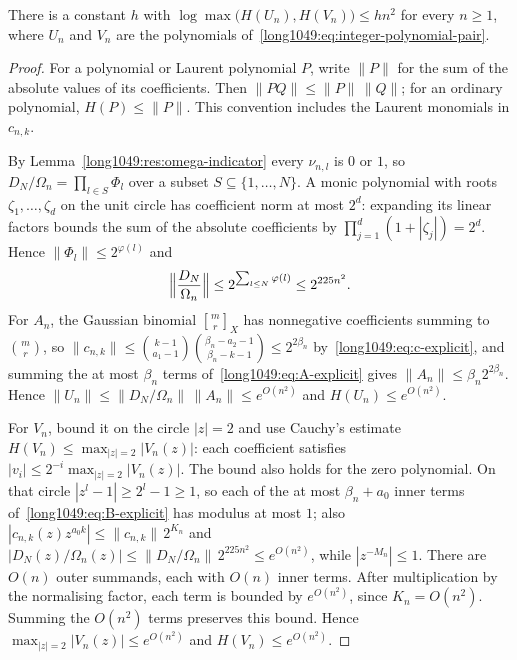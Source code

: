 \documentclass[11pt]{article}
\begin{document}
\begin{lemma}\label{long1049:res:sourceheight}
There is a constant $h$ with
$\log\max\bigl(H(U_n),H(V_n)\bigr)\le hn^{2}$ for every $n\ge1$, where $U_n$ and
$V_n$ are the polynomials of~\eqref{long1049:eq:integer-polynomial-pair}.
\end{lemma}

\begin{proof}
For a polynomial or Laurent polynomial $P$, write $\|P\|$ for the sum
of the absolute values of its coefficients. Then
$\|PQ\|\le\|P\|\,\|Q\|$; for an ordinary polynomial,
$H(P)\le\|P\|$. This convention includes the Laurent monomials in
$c_{n,k}$.

By Lemma~\ref{long1049:res:omega-indicator} every $\nu_{n,l}$ is $0$ or $1$, so
$D_N/\Omega_n=\prod_{l\in S}\Phi_l$ over a subset $S\subseteq\{1,\dots,N\}$.
A monic polynomial with roots $\zeta_1,\ldots,\zeta_d$ on the unit circle
has coefficient norm at most $2^d$: expanding its linear factors bounds
the sum of the absolute coefficients by
$\prod_{j=1}^d(1+|\zeta_j|)=2^d$. Hence $\|\Phi_l\|\le2^{\varphi(l)}$ and
\[
 \Bigl\|\frac{D_N}{\Omega_n}\Bigr\|\le2^{\sum_{l\le N}\varphi(l)}\le2^{225n^{2}} .
\]
For $A_n$, the Gaussian binomial $\genfrac{[}{]}{0pt}{}{m}{r}_X$ has nonnegative
coefficients summing to $\binom{m}{r}$, so
$\|c_{n,k}\|\le\binom{k-1}{a_1-1}\binom{\beta_n-a_2-1}{\beta_n-k-1}\le2^{2\beta_n}$
by~\eqref{long1049:eq:c-explicit}, and summing the at most $\beta_n$ terms
of~\eqref{long1049:eq:A-explicit} gives $\|A_n\|\le\beta_n2^{2\beta_n}$.  Hence
$\|U_n\|\le\|D_N/\Omega_n\|\,\|A_n\|\le e^{O(n^{2})}$ and
$H(U_n)\le e^{O(n^{2})}$.

For $V_n$, bound it on the circle $|z|=2$ and use Cauchy's estimate
$H(V_n)\le\max_{|z|=2}|V_n(z)|$: each coefficient satisfies
$|v_i|\le2^{-i}\max_{|z|=2}|V_n(z)|$. The bound also holds for the
zero polynomial.  On that circle
$|z^{l}-1|\ge2^{l}-1\ge1$, so each of the at most $\beta_n+a_0$ inner terms
of~\eqref{long1049:eq:B-explicit} has modulus at most $1$; also
$|c_{n,k}(z)z^{a_0k}|\le\|c_{n,k}\|\,2^{K_n}$ and
$|D_N(z)/\Omega_n(z)|\le\|D_N/\Omega_n\|\,2^{225n^{2}}\le e^{O(n^{2})}$, while
$|z^{-M_n}|\le1$. There are $O(n)$ outer summands, each with $O(n)$
inner terms. After multiplication by the normalising factor, each
term is bounded by $e^{O(n^2)}$, since $K_n=O(n^2)$. Summing the
$O(n^2)$ terms preserves this bound. Hence
$\max_{|z|=2}|V_n(z)|\le e^{O(n^2)}$ and $H(V_n)\le e^{O(n^2)}$.
\end{proof}
\end{document}
